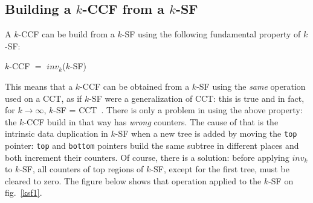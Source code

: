 \documentclass[a4paper,11pt]{report}
\begin{document}
\subsection{Building a $k$-CCF from a $k$-SF}

A $k$-CCF can be build from a $k$-SF using the following fundamental property of $k$-SF:
\begin{center}
$k$-CCF $=$ $inv_k$($k$-SF)
\end{center}
This means that a $k$-CCF can be obtained from a $k$-SF using the \emph{same} operation
used on a CCT, as if $k$-SF were a generalization of CCT: this is true and in fact, for $k\rightarrow \infty$, $k$-SF = CCT~\cite{kccf}.
There is only a problem in using the above property: the $k$-CCF build in that way has \emph{wrong} counters. The cause of that is the intrinsic data duplication in $k$-SF when a new tree is added by moving the \verb|top| pointer: \verb|top| and \verb|bottom| pointers build the same subtree in different places and both increment their counters. Of course, there is a solution: before applying $inv_k$ to $k$-SF, all counters of top regions of $k$-SF, except for the first tree, must be cleared to zero. The figure below shows that operation applied to the $k$-SF on fig.~\ref{ksf1}.
\end{document}
